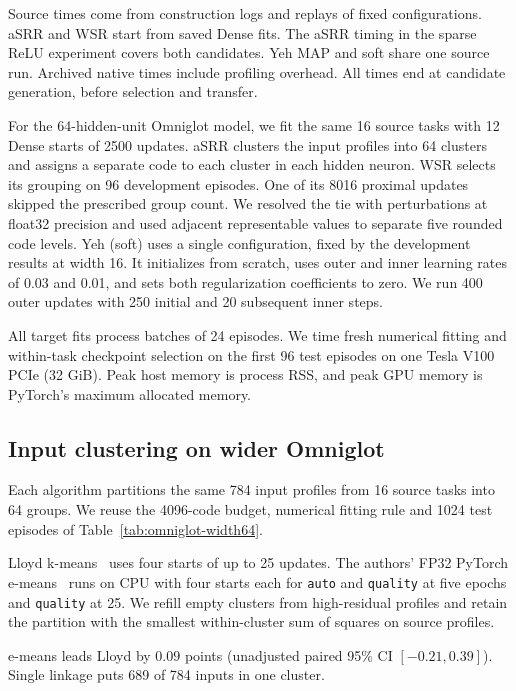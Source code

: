 Source times come from construction logs and replays of fixed
configurations. aSRR and WSR start from saved Dense fits. The aSRR
timing in the sparse ReLU experiment covers both candidates. Yeh MAP
and soft share one source run. Archived native times include profiling
overhead. All times end at candidate generation, before selection and
transfer.

For the 64-hidden-unit Omniglot model, we fit the same 16 source tasks
with 12 Dense starts of 2500 updates. aSRR clusters the input profiles
into 64 clusters and assigns a separate code to each cluster in each
hidden neuron. WSR selects its grouping on 96 development episodes.
One of its 8016 proximal updates skipped the prescribed group count.
We resolved the tie with perturbations at float32 precision and used
adjacent representable values to separate five rounded code levels.
Yeh (soft) uses a single configuration, fixed by the development results
at width 16. It initializes from scratch, uses outer and inner learning
rates of 0.03 and 0.01, and sets both regularization coefficients to zero.
We run 400 outer updates with 250 initial and 20 subsequent inner steps.

All target fits process batches of 24 episodes. We time fresh numerical
fitting and within-task checkpoint selection on the first 96 test episodes
on one Tesla V100 PCIe (32 GiB). Peak host memory is process RSS, and
peak GPU memory is PyTorch's maximum allocated memory.

\subsection{Input clustering on wider Omniglot}
\label{app:omniglot-clustering}

Each algorithm partitions the same 784 input profiles from 16 source
tasks into 64 groups. We reuse the 4096-code budget, numerical fitting
rule and 1024 test episodes of Table~\ref{tab:omniglot-width64}.

Lloyd k-means~\cite{lloyd1982quantization} uses four starts of up to 25
updates. The authors' FP32 PyTorch e-means~\cite{bessa2026emeans} runs on
CPU with four starts each for \texttt{auto} and \texttt{quality} at five
epochs and \texttt{quality} at 25. We refill empty clusters from
high-residual profiles and retain the partition with the smallest
within-cluster sum of squares on source profiles.

e-means leads Lloyd by $0.09$ points (unadjusted paired 95\% CI
$[-0.21,0.39]$). Single linkage puts 689 of 784 inputs in one cluster.

